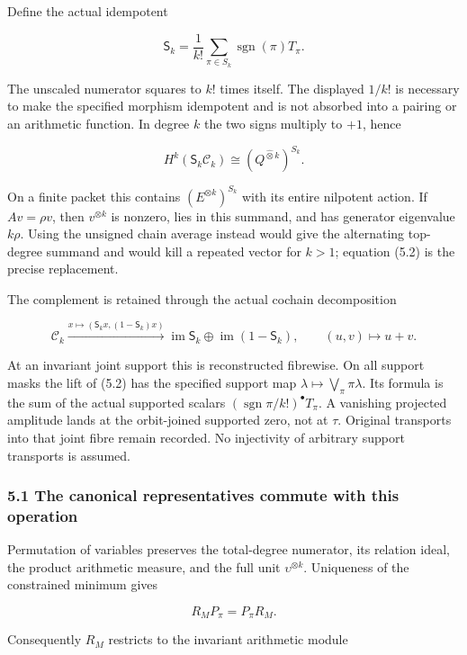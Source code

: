 \documentclass[
]{article}
\begin{document}
Define the actual idempotent

\[\boxed{\mathsf S_k=\frac1{k!}\sum_{\pi\in S_k}\operatorname{sgn}(\pi)T_\pi.}\tag{5.2}\]

The unscaled numerator squares to \(k!\) times itself. The displayed
\(1/k!\) is necessary to make the specified morphism idempotent and is
not absorbed into a pairing or an arithmetic function. In degree \(k\)
the two signs multiply to \(+1\), hence

\[\boxed{H^k(\mathsf S_k\mathcal C_k)\cong
(Q^{\widehat\otimes k})^{S_k}.}\tag{5.3}\]

On a finite packet this contains \((E^{\otimes k})^{S_k}\) with its
entire nilpotent action. If \(Av=\rho v\), then \(v^{\otimes k}\) is
nonzero, lies in this summand, and has generator eigenvalue \(k\rho\).
Using the unsigned chain average instead would give the alternating
top-degree summand and would kill a repeated vector for \(k>1\);
equation (5.2) is the precise replacement.

The complement is retained through the actual cochain decomposition

\[\mathcal C_k\xrightarrow{x\mapsto(\mathsf S_kx,(1-\mathsf S_k)x)}
\operatorname{im}\mathsf S_k\oplus\operatorname{im}(1-\mathsf S_k),\qquad (u,v)\mapsto u+v.\tag{5.4}\]

At an invariant joint support this is reconstructed fibrewise. On all
support masks the lift of (5.2) has the specified support map
\(\lambda\mapsto\bigvee_\pi\pi\lambda\). Its formula is the sum of the
actual supported scalars \((\operatorname{sgn}\pi/k!)^\bullet T_\pi\). A
vanishing projected amplitude lands at the orbit-joined supported zero,
not at \(\tau\). Original transports into that joint fibre remain
recorded. No injectivity of arbitrary support transports is assumed.

\subsubsection{5.1 The canonical representatives commute with this
operation}\label{the-canonical-representatives-commute-with-this-operation}

Permutation of variables preserves the total-degree numerator, its
relation ideal, the product arithmetic measure, and the full unit
\(\upsilon^{\otimes k}\). Uniqueness of the constrained minimum gives

\[R_MP_\pi=P_\pi R_M.\tag{5.5}\]

Consequently \(R_M\) restricts to the invariant arithmetic module
\end{document}

